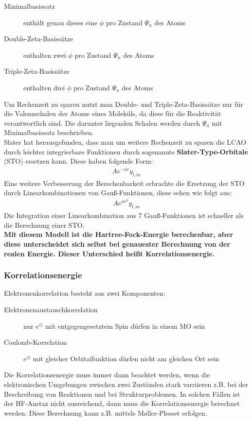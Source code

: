 \documentclass[12pt,a4paper,oneside,normalheadings,abstracton,liststotoc,bibtotoc,titlepage,pdftex]{scrartcl}
\begin{document}
\begin{description}
\item[Minimalbasissatz] enthält genau dieses eine $\phi$ pro Zustand $\Psi_n$ des Atoms
\item[Double-Zeta-Basissätze] enthalten zwei $\phi$ pro Zustand $\Psi_n$ des Atoms
\item[Triple-Zeta-Basissätze] enthalten drei $\phi$ pro Zustand $\Psi_n$ des Atoms
\end{description}
Um Rechenzeit zu sparen nutzt man Double- und Triple-Zeta-Basissätze nur für die Valenzschalen der Atome eines Moleküls, da diese für die Reaktivität verantwortlich sind. Die darunter liegenden Schalen werden durch $\Psi_n$ mit Minimalbasissatz beschrieben.\\
Slater hat herausgefunden, dass man um weitere Rechenzeit zu sparen die LCAO durch leichter integrierbare Funktionen durch sogenannte \textbf{Slater-Type-Orbitale} (STO) ersetzen kann. Diese haben folgende Form:
\begin{align}
A e^{-\phi r}y_{l,m}
\end{align}
Eine weitere Verbesserung der Berechenbarkeit erbrachte die Ersetzung der STO durch Linearkombinationen von Gauß-Funktionen, diese sehen wie folgt aus:
\begin{align}
A e^{\phi r^2}y_{l,m}
\end{align}
Die Integration einer Linearkombination aus 7 Gauß-Funktionen ist schneller als die Berechnung einer STO.\\
\textbf{Mit diesem Modell ist die Hartree-Fock-Energie berechenbar, aber diese unterscheidet sich selbst bei genauester Berechnung von der realen Energie. Dieser Unterschied heißt Korrelationsenergie.}
\subsubsection{Korrelationsenergie}
Elektronenkorrelation besteht aus zwei Komponenten:
\begin{description}
\item [Elektronenaustauschkorrelation] nur ${e^\circleddash}$ mit entgegengesetztem Spin dürfen in einem MO sein
\item [Coulomb-Korrelation] ${e^\circleddash}$ mit gleicher Orbitalfunktion dürfen nicht am gleichen Ort sein
\end{description}
Die Korrelationsenergie muss immer dann beachtet werden, wenn die elektronischen Umgebungen zwischen zwei Zuständen stark varriieren z.B. bei der Beschreibung von Reaktionen und bei Strukturproblemen. In solchen Fällen ist der HF-Anstaz nicht ausreichend, dann muss die Korrelationsenergie berechnet werden. Diese Berechnung kann z.B. mittels M\o ller-Plesset erfolgen.
\end{document}

